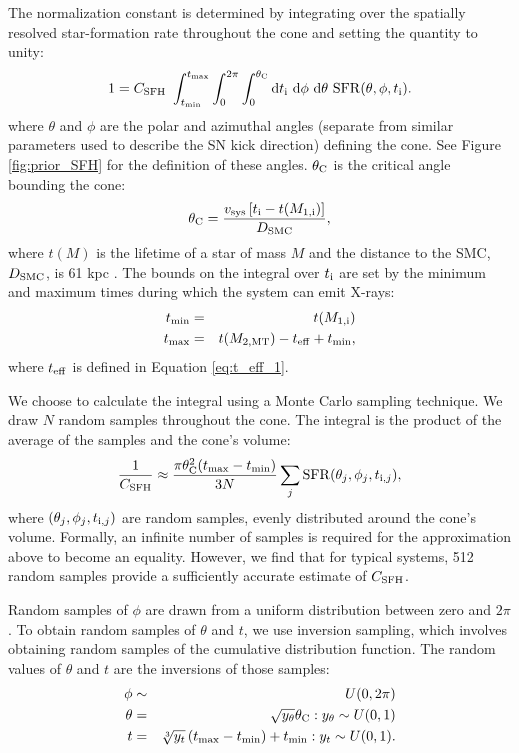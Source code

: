 \documentclass[usenatbib]{mnras}
\newcommand{\dd}{\mathrm{d}}
\begin{document}
The normalization constant is determined by integrating over the spatially resolved star-formation rate throughout the cone and setting the quantity to unity:
\begin{equation}
1 = C_{\rm SFH}\ \int_{t_{\rm min}}^{t_{\rm max}} \int_0^{2 \pi} \int_0^{\theta_{\rm C}} \dd t_{\rm i}\ \dd \phi\ \dd \theta\ {\rm SFR}(\theta, \phi, t_{\rm i}). 
\end{equation}
where $\theta$ and $\phi$ are the polar and azimuthal angles (separate from similar parameters used to describe the SN kick direction) defining the cone. See Figure \ref{fig:prior_SFH} for the definition of these angles. $\theta_{\rm C}$ is the critical angle bounding the cone:
\begin{equation}
\theta_{\rm C} = \frac{v_{\rm sys} \left[ t_{\rm i} - t(M_{\rm 1,i}) \right]}{D_{\rm SMC}}, \label{eq:theta_c}
\end{equation}
where $t(M)$ is the lifetime of a star of mass $M$ and the distance to the SMC, $D_{\rm SMC}$, is 61 kpc \citep{hilditch05}. The bounds on the integral over $t_{\rm i}$ are set by the minimum and maximum times during which the system can emit X-rays: 
\begin{eqnarray}
t_{\rm min} &=& t(M_{\rm 1,i}) \\
t_{\rm max} &=& t(M_{\rm 2,MT}) - t_{\rm eff} + t_{\rm min},
\end{eqnarray}
where $t_{\rm eff}$ is defined in Equation \ref{eq:t_eff_1}.

We choose to calculate the integral using a Monte Carlo sampling technique. We draw $N$ random samples throughout the cone. The integral is the product of the average of the samples and the cone's volume:
\begin{equation}
\frac{1}{C_{\rm SFH}} \approx \frac{\pi \theta_{\rm C}^2 (t_{\rm max} - t_{\rm min})}{3N} \sum_j {\rm SFR}(\theta_j, \phi_j, t_{{\rm i},j}),
\end{equation}
where $(\theta_j, \phi_j, t_{{\rm i},j})$ are random samples, evenly distributed around the cone's volume. Formally, an infinite number of samples is required for the approximation above to become an equality. However, we find that for typical systems, 512 random samples provide a sufficiently accurate estimate of $C_{\rm SFH}$.



Random samples of $\phi$ are drawn from a uniform distribution between zero and $2\pi$. To obtain random samples of $\theta$ and $t$, we use inversion sampling, which involves obtaining random samples of the cumulative distribution function. The random values of $\theta$ and $t$ are the inversions of those samples:
 \begin{eqnarray}
\phi &\sim& U(0, 2\pi) \\
\theta &=& \sqrt{y_{\theta}} \theta_{\rm C}: y_{\theta} \sim U(0,1) \\
t &=& \sqrt[3]{y_{t}}\left( t_{\rm max} - t_{\rm min} \right) + t_{\rm min}: y_t \sim U(0,1).
\end{eqnarray}
\end{document}
